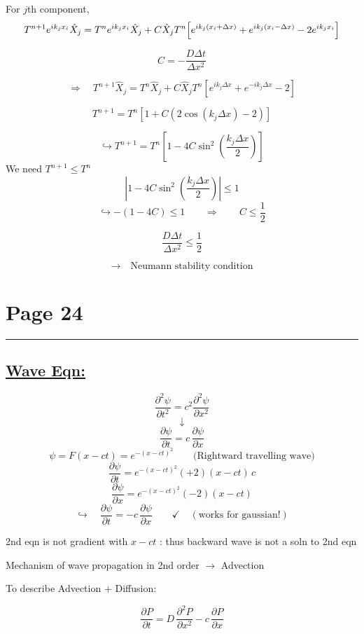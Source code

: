 \documentclass[11pt,a4paper]{article}
\newcommand{\pagehead}[1]{%
  \clearpage
  \section*{Page #1}
  \vspace{-0.6em}
  {\color{black!45}\rule{\linewidth}{0.5pt}}
  \vspace{0.4em}
}
\begin{document}
For $j$th component,
\begin{multline*}
T^{n+1}e^{ik_jx_i}\hat X_j
=T^ne^{ik_jx_i}\hat X_j
+C\hat X_jT^n\Bigl[e^{ik_j(x_i+\Delta x)}
+e^{ik_j(x_i-\Delta x)}-2e^{ik_jx_i}\Bigr]
\end{multline*}
\begin{handbox}
\[
C=-\frac{D\Delta t}{\Delta x^2}
\]
\end{handbox}
\[
\Rightarrow\quad T^{n+1}\hat X_j
=T^n\hat X_j+C\hat X_jT^n
\left[e^{ik_j\Delta x}+e^{-ik_j\Delta x}-2\right]
\]
\begin{handbox}
\[
T^{n+1}=T^n\left[1+C\left(2\cos(k_j\Delta x)-2\right)\right]
\]
\end{handbox}
\[
\hookrightarrow T^{n+1}=T^n\left[1-4C\sin^2\left(\frac{k_j\Delta x}{2}\right)\right]
\]
We need $T^{n+1}\le T^n$
\[
\left|1-4C\sin^2\left(\frac{k_j\Delta x}{2}\right)\right|\le1
\]
\[
\hookrightarrow -(1-4C)\le1
\qquad\Longrightarrow\qquad
\boxed{C\le\frac12}
\]
\begin{handbox}
\[
\frac{D\Delta t}{\Delta x^2}\le\frac12
\]
\end{handbox}
\[
\longrightarrow\quad\text{Neumann stability condition}
\]

\pagehead{24}

\subsection*{\underline{Wave Eqn:}}
\[
\frac{\partial^2\psi}{\partial t^2}=c^2\frac{\partial^2\psi}{\partial x^2}
\]
\[
\downarrow
\]
\[
\frac{\partial\psi}{\partial t}=c\,\frac{\partial\psi}{\partial x}
\]
\[
\psi=F(x-ct)=e^{-(x-ct)^2}
\qquad\text{(Rightward travelling wave)}
\]
\[
\frac{\partial\psi}{\partial t}
=e^{-(x-ct)^2}(+2)(x-ct)\,c
\]
\[
\frac{\partial\psi}{\partial x}
=e^{-(x-ct)^2}(-2)(x-ct)
\]
\[
\hookrightarrow\quad
\frac{\partial\psi}{\partial t}=-c\,\frac{\partial\psi}{\partial x}
\qquad\checkmark\quad(\text{works for gaussian!})
\]

2nd eqn is not gradient with $x-ct$ : thus backward wave is not a soln to
2nd eqn

Mechanism of wave propagation in 2nd order $\to$ Advection

To describe Advection + Diffusion:
\begin{handbox}
\[
\frac{\partial P}{\partial t}
=D\,\frac{\partial^2P}{\partial x^2}-c\,\frac{\partial P}{\partial x}
\]
\end{handbox}
\end{document}
